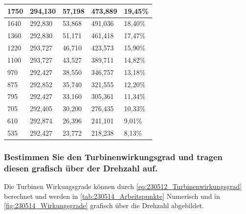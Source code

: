 \begin{table}[H]
\begin{tabular}{|l|l|l|l|l|}
      \rowcolor[HTML]{E2EFDA} 
      1750                                & 294,130      & 57,198        & 473,889     & \cellcolor[HTML]{DDEBF7}19,45\%      \\ \hline
      \rowcolor[HTML]{A9D08E} 
      1640                                & 292,830      & 53,868        & 491,036     & \cellcolor[HTML]{BDD7EE}18,40\%      \\ \hline
      \rowcolor[HTML]{E2EFDA} 
      1360                                & 292,830      & 51,171        & 461,418     & \cellcolor[HTML]{DDEBF7}17,47\%      \\ \hline
      \rowcolor[HTML]{A9D08E} 
      1220                                & 293,727      & 46,710        & 423,573     & \cellcolor[HTML]{BDD7EE}15,90\%      \\ \hline
      \rowcolor[HTML]{E2EFDA} 
      1100                                & 293,727      & 43,527        & 389,711     & \cellcolor[HTML]{DDEBF7}14,82\%      \\ \hline
      \rowcolor[HTML]{A9D08E} 
      970                                 & 292,427      & 38,550        & 346,757     & \cellcolor[HTML]{BDD7EE}13,18\%      \\ \hline
      \rowcolor[HTML]{E2EFDA} 
      875                                 & 292,852      & 35,740        & 321,555     & \cellcolor[HTML]{DDEBF7}12,20\%      \\ \hline
      \rowcolor[HTML]{A9D08E} 
      795                                 & 292,427      & 33,160        & 305,361     & \cellcolor[HTML]{BDD7EE}11,34\%      \\ \hline
      \rowcolor[HTML]{E2EFDA} 
      705                                 & 292,405      & 30,200        & 276,435     & \cellcolor[HTML]{DDEBF7}10,33\%      \\ \hline
      \rowcolor[HTML]{A9D08E} 
      610                                 & 292,874      & 26,396        & 241,101     & \cellcolor[HTML]{BDD7EE}9,01\%       \\ \hline
      \rowcolor[HTML]{E2EFDA} 
      535                                 & 292,427      & 23,772        & 218,238     & \cellcolor[HTML]{DDEBF7}8,13\%       \\ \hline
  \end{tabular}
  \label{tab:230514_Arbeitspunkte}
\end{table}

\subsubsection{Bestimmen Sie den Turbinenwirkungsgrad und tragen diesen grafisch über der Drehzahl auf.}
Die Turbinen Wirkungsgrade können durch \autoref{eq:230512_Turbinenwirkungsgrad} berechnet und werden in \autoref{tab:230514_Arbeitspunkte} Numerisch und in \autoref{fig:230514_Wirkungsgrade} grafisch über die Drehzahl abgebildet. 

